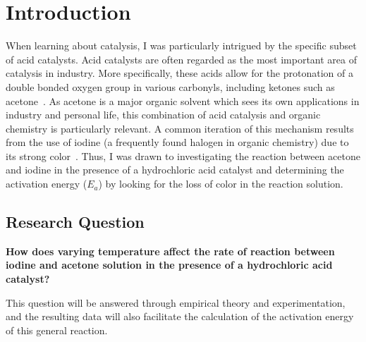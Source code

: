 \section{Introduction}
When learning about catalysis, I was particularly intrigued by the specific subset of acid catalysts. Acid catalysts are often regarded as the most important area of catalysis in industry. More specifically, these acids allow for the protonation of a double bonded oxygen group in various carbonyls, including ketones such as acetone~\parencite{acid_catalyst}. As acetone is a major organic solvent which sees its own applications in industry and personal life, this combination of acid catalysis and organic chemistry is particularly relevant. A common iteration of this mechanism results from the use of iodine (a frequently found halogen in organic chemistry) due to its strong color~\parencite{iodine_coloring}. Thus, I was drawn to investigating the reaction between acetone and iodine in the presence of a hydrochloric acid catalyst and determining the activation energy ($E_a$) by looking for the loss of color in the reaction solution.

\subsection{Research Question}
\textbf{How does varying temperature affect the rate of reaction between iodine and acetone solution in the presence of a hydrochloric acid catalyst?}

This question will be answered through empirical theory and experimentation, and the resulting data will also facilitate the calculation of the activation energy of this general reaction.
